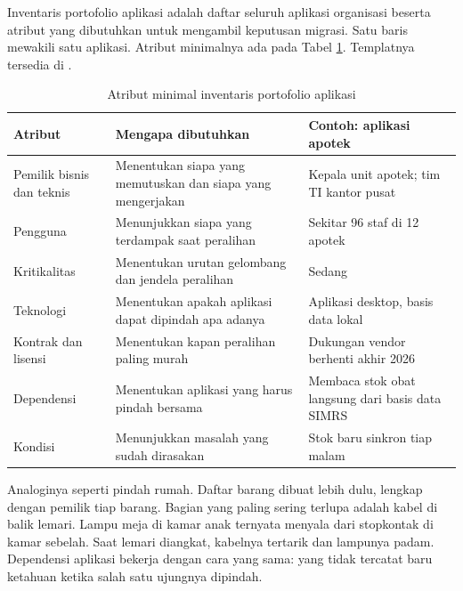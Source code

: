 Inventaris portofolio aplikasi adalah daftar seluruh aplikasi organisasi beserta atribut
yang dibutuhkan untuk mengambil keputusan migrasi. Satu baris mewakili satu aplikasi.
Atribut minimalnya ada pada Tabel \ref{tab:ch04-atribut-inventaris}. Templatnya tersedia
di .

\begin{table}[!htb]
  \centering
  \footnotesize
  \caption{Atribut minimal inventaris portofolio aplikasi}
  \label{tab:ch04-atribut-inventaris}
  \begin{tabularx}{\textwidth}{>{\raggedright\arraybackslash}p{2.2cm}
                               >{\raggedright\arraybackslash}X
                               >{\raggedright\arraybackslash}X}
    \hline
    \textbf{Atribut} & \textbf{Mengapa dibutuhkan} & \textbf{Contoh: aplikasi apotek} \\
    \hline
    Pemilik bisnis dan teknis & Menentukan siapa yang memutuskan dan siapa yang
      mengerjakan & Kepala unit apotek; tim TI kantor pusat \\
    \hline
    Pengguna & Menunjukkan siapa yang terdampak saat peralihan & Sekitar 96 staf di 12
      apotek \\
    \hline
    Kritikalitas & Menentukan urutan gelombang dan jendela peralihan & Sedang \\
    \hline
    Teknologi & Menentukan apakah aplikasi dapat dipindah apa adanya & Aplikasi desktop,
      basis data lokal \\
    \hline
    Kontrak dan lisensi & Menentukan kapan peralihan paling murah & Dukungan vendor
      berhenti akhir 2026 \\
    \hline
    Dependensi & Menentukan aplikasi yang harus pindah bersama & Membaca stok obat langsung
      dari basis data SIMRS \\
    \hline
    Kondisi & Menunjukkan masalah yang sudah dirasakan & Stok baru sinkron tiap malam \\
    \hline
  \end{tabularx}
\end{table}

Analoginya seperti pindah rumah. Daftar barang dibuat lebih dulu, lengkap dengan pemilik
tiap barang. Bagian yang paling sering terlupa adalah kabel di balik lemari. Lampu meja di
kamar anak ternyata menyala dari stopkontak di kamar sebelah. Saat lemari diangkat,
kabelnya tertarik dan lampunya padam. Dependensi aplikasi bekerja dengan cara yang sama:
yang tidak tercatat baru ketahuan ketika salah satu ujungnya dipindah.

